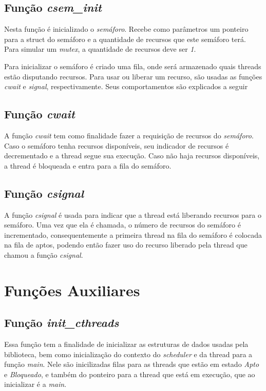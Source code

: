 \documentclass{article}
\begin{document}
\subsection{Função \textit{csem\_init}}
Nesta função é inicializado o \textit{semáforo}. Recebe como parâmetros um ponteiro para a struct do semáforo e a quantidade de recursos que este semáforo terá. Para simular um \textit{mutex}, a quantidade de recursos deve ser \textit{1}.

Para inicializar o semáforo é criado uma fila, onde será armazenado quais threads estão disputando recursos. Para usar ou liberar um recurso, são usadas as funções \textit{cwait} e \textit{signal}, respectivamente. Seus comportamentos são explicados a seguir

\subsection{Função \textit{cwait}}
A função \textit{cwait} tem como finalidade fazer a requisição de recursos do \textit{semáforo}. Caso o semáforo tenha recursos disponíveis, seu indicador de recursos é decrementado e a thread segue sua execução. Caso não haja recursos disponíveis, a thread é bloqueada e entra para a fila do semáforo.

\subsection{Função \textit{csignal}}
A função \textit{csignal} é usada para indicar que a thread está liberando recursos para o semáforo. Uma vez que ela é chamada, o número de recursos do semáforo é incrementado, consequentemente a primeira thread na fila do semáforo é colocada na fila de aptos, podendo então fazer uso do recurso liberado pela thread que chamou a função \textit{csignal}.

\section{Funções Auxiliares}

\subsection{Função \textit{init\_cthreads}}
Essa função tem a finalidade de inicializar as estruturas de dados usadas pela biblioteca, bem como inicialização do contexto do \textit{scheduler} e da thread para a função \textit{main}. Nele são inicilizadas filas para as threads que estão em estado \textit{Apto} e \textit{Bloqueado}, e também do ponteiro para a thread que está em execução, que ao inicializar é a \textit{main}.
\end{document}
